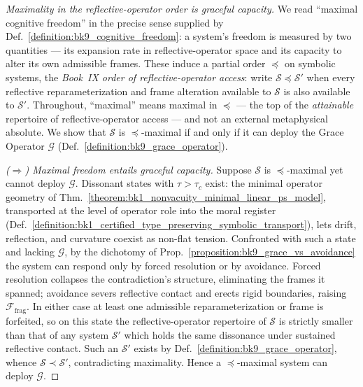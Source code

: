 \begin{proof}[Maximality in the reflective-operator order is graceful capacity]
\label{proof:bk9_freedom_as_grace}
\leavevmode
We read ``maximal cognitive freedom'' in the precise sense supplied by
Def.~\ref{definition:bk9_cognitive_freedom}: a system's freedom is measured by
two quantities --- its expansion rate in reflective-operator space and its
capacity to alter its own admissible frames. These induce a partial order
$\preceq$ on symbolic systems, the \emph{Book~IX order of reflective-operator
access}: write $\mathcal{S}\preceq\mathcal{S}'$ when every reflective
reparameterization and frame alteration available to $\mathcal{S}$ is also
available to $\mathcal{S}'$. Throughout, ``maximal'' means maximal in $\preceq$
--- the top of the \emph{attainable} repertoire of reflective-operator access ---
and not an external metaphysical absolute. We show that $\mathcal{S}$ is
$\preceq$-maximal if and only if it can deploy the Grace Operator $\mathcal{G}$
(Def.~\ref{definition:bk9_grace_operator}).

\emph{($\Rightarrow$) Maximal freedom entails graceful capacity.} Suppose
$\mathcal{S}$ is $\preceq$-maximal yet cannot deploy $\mathcal{G}$. Dissonant
states with $\tau>\tau_c$ exist: the minimal operator geometry of
Thm.~\ref{theorem:bk1_nonvacuity_minimal_linear_ps_model}, transported at the
level of operator role into the moral register
(Def.~\ref{definition:bk1_certified_type_preserving_symbolic_transport}), lets
drift, reflection, and curvature coexist as non-flat tension. Confronted with
such a state and lacking $\mathcal{G}$, by the dichotomy of
Prop.~\ref{proposition:bk9_grace_vs_avoidance} the system can respond only by
forced resolution or by avoidance. Forced resolution collapses the
contradiction's structure, eliminating the frames it spanned; avoidance severs
reflective contact and erects rigid boundaries, raising
$\mathcal{F}_{\text{frag}}$. In either case at least one admissible
reparameterization or frame is forfeited, so on this state the
reflective-operator repertoire of $\mathcal{S}$ is strictly smaller than that of
any system $\mathcal{S}'$ which holds the same dissonance under sustained
reflective contact. Such an $\mathcal{S}'$ exists by
Def.~\ref{definition:bk9_grace_operator}, whence $\mathcal{S}\prec\mathcal{S}'$,
contradicting maximality. Hence a $\preceq$-maximal system can deploy
$\mathcal{G}$.


\end{proof}

